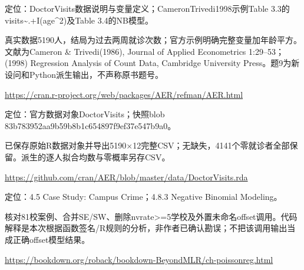 \par\noindent\begin{minipage}{\linewidth}\raggedright{}\label{src:G7-AER}
\par
定位：DoctorVisits数据说明与变量定义；CameronTrivedi1998示例Table 3.3的visits\textasciitilde{}.+I(age\textasciicircum{}2)及Table 3.4的NB模型。\par
真实数据5190人，结局为过去两周就诊次数；官方示例明确完整变量加年龄平方。文献为Cameron \& Trivedi(1986), Journal of Applied Econometrics 1:29–53；(1998) Regression Analysis of Count Data, Cambridge University Press。题9为新设问和Python派生输出，不声称原书题号。\par
{\small \url{https://cran.r-project.org/web/packages/AER/refman/AER.html}}\par
\end{minipage}\par\medskip

\par\noindent\begin{minipage}{\linewidth}\raggedright{}\label{src:G7-DOCTOR-DATA}
\par
定位：官方数据对象DoctorVisits；快照blob 83b783952aa9b59b8b1c654897f9ef37e547b9a0。\par
已保存原始R数据对象并导出5190×12完整CSV；无缺失，4141个零就诊者全部保留。派生的逐人拟合均数与零概率另存CSV。\par
{\small \url{https://github.com/cran/AER/blob/master/data/DoctorVisits.rda}}\par
\end{minipage}\par\medskip

\par\noindent\begin{minipage}{\linewidth}\raggedright{}\label{src:G7-CAMPUS-BOOK}
\par
定位：4.5 Case Study: Campus Crime；4.8.3 Negative Binomial Modeling。\par
核对81校案例、合并SE/SW、删除nvrate>=5学校及外置未命名offset调用。代码解释是本次根据函数签名/R规则的分析，非作者已确认勘误；不把该调用输出当成正确offset模型结果。\par
{\small \url{https://bookdown.org/roback/bookdown-BeyondMLR/ch-poissonreg.html}}\par
\end{minipage}\par\medskip

